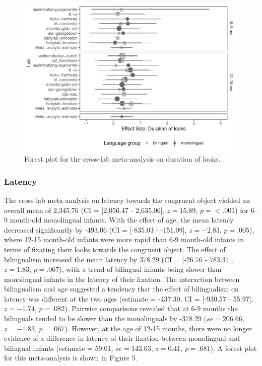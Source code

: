 \documentclass[,man,floatsintext]{apa6}
\begin{document}
\begin{figure}
\centering
\includegraphics{gaze-following-paper_files/figure-latex/fig4-1.pdf}
\caption{\label{fig:fig4}Forest plot for the cross-lab meta-analysis on duration of looks.}
\end{figure}

\hypertarget{latency}{%
\subsubsection{Latency}\label{latency}}

The cross-lab meta-analysis on latency towards the congruent object yielded an overall mean of 2,345.76 (CI = {[}2,056.47 - 2,635.06{]}, \(z = 15.89\), \(p = < .001\)) for 6--9 month-old monolingual infants. With the effect of age, the mean latency decreased significantly by -493.06 (CI = {[}-835.03 - -151.09{]}, \(z = -2.83\), \(p = .005\)), where 12-15 month-old infants were more rapid than 6-9 month-old infants in terms of fixating their looks towards the congruent object. The effect of bilingualism increased the mean latency by 378.29 (CI = {[}-26.76 - 783.34{]}, \(z = 1.83\), \(p = .067\)), with a trend of bilingual infants being slower than monolingual infants in the latency of their fixation. The interaction between bilingualism and age suggested a tendency that the effect of bilingualism on latency was different at the two ages (estimate = -437.30, CI = {[}-930.57 - 55.97{]}, \(z = -1.74\), \(p = .082\)). Pairwise comparisons revealed that at 6-9 months the bilinguals tended to be slower than the monolinguals by -378.29 (\(se = 206.66\), \(z = -1.83\), \(p = .067\)). However, at the age of 12-15 months, there were no longer evidence of a difference in latency of their fixation between monolingual and bilingual infants (estimate = 59.01, \(se = 143.63\), \(z = 0.41\), \(p = .681\)). A forest plot for this meta-analysis is shown in Figure 5.
\end{document}
